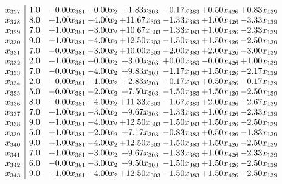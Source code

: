 \documentclass[8pt]{article}
\begin{document}
\[\begin{array}{c| c c@{\hskip 2pt} c@{\hskip 2pt} c@{\hskip 2pt} c@{\hskip 2pt} c@{\hskip 2pt} c@{\hskip 2pt} }
 x_{327}   &  1.0 & -0.00 x_{381} & -0.00 x_{2} & +  1.83 x_{303} & -0.17 x_{383} & +  0.50 x_{426} & +  0.83 x_{139}\\
 x_{328}   &  8.0 & +  1.00 x_{381} & -4.00 x_{2} & + 11.67 x_{303} & -1.33 x_{383} & +  1.00 x_{426} & -3.33 x_{139}\\
 x_{329}   &  7.0 & +  1.00 x_{381} & -3.00 x_{2} & + 10.67 x_{303} & -1.33 x_{383} & +  1.00 x_{426} & -2.33 x_{139}\\
 x_{330}   &  9.0 & +  1.00 x_{381} & -4.00 x_{2} & + 12.50 x_{303} & -1.50 x_{383} & +  1.50 x_{426} & -2.50 x_{139}\\
 x_{331}   &  7.0 & -0.00 x_{381} & -3.00 x_{2} & + 10.00 x_{303} & -2.00 x_{383} & +  2.00 x_{426} & -3.00 x_{139}\\
 x_{332}   &  2.0 & +  1.00 x_{381} & +  0.00 x_{2} & +  3.00 x_{303} & +  0.00 x_{383} & -0.00 x_{426} & +  1.00 x_{139}\\
 x_{333}   &  7.0 & -0.00 x_{381} & -4.00 x_{2} & +  9.83 x_{303} & -1.17 x_{383} & +  1.50 x_{426} & -2.17 x_{139}\\
 x_{334}   &  2.0 & -0.00 x_{381} & -1.00 x_{2} & +  2.83 x_{303} & -0.17 x_{383} & +  0.50 x_{426} & -0.17 x_{139}\\
 x_{335}   &  5.0 & -0.00 x_{381} & -2.00 x_{2} & +  7.50 x_{303} & -1.50 x_{383} & +  1.50 x_{426} & -2.50 x_{139}\\
 x_{336}   &  8.0 & -0.00 x_{381} & -4.00 x_{2} & + 11.33 x_{303} & -1.67 x_{383} & +  2.00 x_{426} & -2.67 x_{139}\\
 x_{337}   &  7.0 & +  1.00 x_{381} & -3.00 x_{2} & +  9.67 x_{303} & -1.33 x_{383} & +  1.00 x_{426} & -2.33 x_{139}\\
 x_{338}   &  9.0 & +  1.00 x_{381} & -4.00 x_{2} & + 12.50 x_{303} & -1.50 x_{383} & +  1.50 x_{426} & -2.50 x_{139}\\
 x_{339}   &  5.0 & +  1.00 x_{381} & -2.00 x_{2} & +  7.17 x_{303} & -0.83 x_{383} & +  0.50 x_{426} & -1.83 x_{139}\\
 x_{340}   &  9.0 & +  1.00 x_{381} & -4.00 x_{2} & + 12.50 x_{303} & -1.50 x_{383} & +  1.50 x_{426} & -2.50 x_{139}\\
 x_{341}   &  7.0 & +  1.00 x_{381} & -3.00 x_{2} & +  9.67 x_{303} & -1.33 x_{383} & +  1.00 x_{426} & -2.33 x_{139}\\
 x_{342}   &  6.0 & -0.00 x_{381} & -3.00 x_{2} & +  9.50 x_{303} & -1.50 x_{383} & +  1.50 x_{426} & -2.50 x_{139}\\
 x_{343}   &  9.0 & +  1.00 x_{381} & -4.00 x_{2} & + 12.50 x_{303} & -1.50 x_{383} & +  1.50 x_{426} & -2.50 x_{139}\\

\end{array}\]
\end{document}
